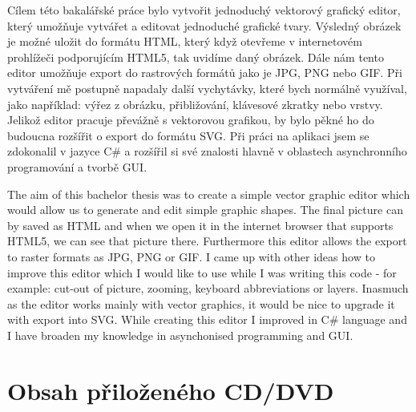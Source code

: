 \documentclass[
  field=inf,
  biblatex=false,
  glossaries,
  index
]{kidiplom}
\begin{document}
\begin{kiconclusions}
Cílem této bakalářské práce bylo vytvořit jednoduchý vektorový grafický editor, který umožňuje vytvářet a editovat jednoduché grafické tvary. Výsledný obrázek je možné uložit do formátu HTML, který když otevřeme v internetovém prohlížeči podporujícím HTML5, tak uvidíme daný obrázek. Dále nám tento editor umožňuje export do rastrových formátů jako je JPG, PNG nebo GIF. Při vytváření mě postupně napadaly další vychytávky, které bych normálně využíval, jako například: výřez z obrázku, přibližování, klávesové zkratky nebo vrstvy. Jelikož editor pracuje převážně s vektorovou grafikou, by bylo pěkné ho do budoucna rozšířit o export do formátu SVG. Při práci na aplikaci jsem se zdokonalil v jazyce C\# a rozšířil si své znalosti hlavně v oblastech asynchronního programování a tvorbě GUI.
\end{kiconclusions}

\begin{kiconclusions}[english]
The aim of this bachelor thesis was to create a simple vector graphic editor which would allow us to generate and edit simple graphic shapes. The final picture can by saved as HTML and when we open it in the internet browser that supports HTML5, we can see that picture there. Furthermore this editor allows the export to raster formats as JPG, PNG or GIF. I came up with other ideas how to improve this editor which I would like to use while I was writing this code - for example: cut-out of picture, zooming, keyboard abbreviations or layers. Inasmuch as the editor works mainly with vector graphics, it would be nice to upgrade it with export into SVG. While creating this editor I improved in C\# language and I have broaden my knowledge in asynchonised programming and GUI.
\end{kiconclusions}

\appendix

\section{Obsah přiloženého CD/DVD} \label{sec:ObsahCD}
\end{document}
